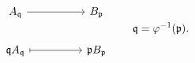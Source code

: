 \[
\begin{tikzcd}[column sep=huge]
A_{\mfq} \arrow[r] & B_{\mfp}\\
\mfq A_{\mfq} \arrow[r,mapsto] & \mfp B_{\mfp}
\end{tikzcd}
\qquad \mfq=\varphi^{-1}(\mfp).
\]
